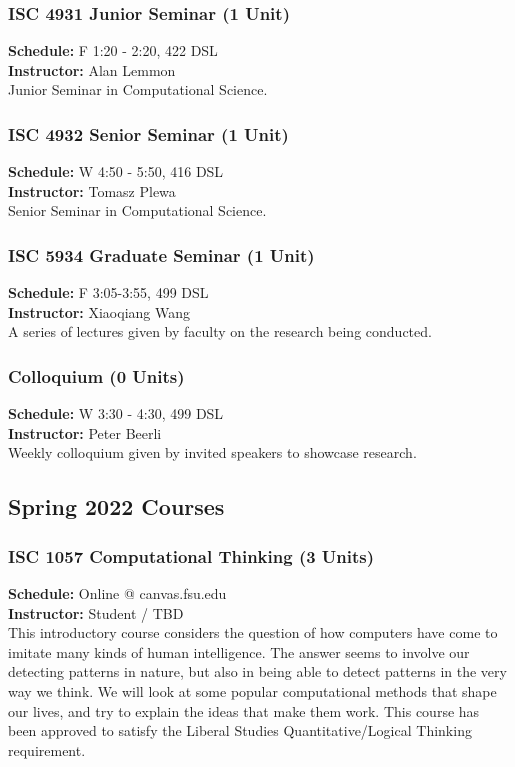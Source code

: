 \documentclass[12pt,a4paper]{article}
\begin{document}
\subsubsection*{ISC 4931 Junior Seminar (1 Unit)}
\textbf{Schedule:} F 1:20 - 2:20, 422 DSL \\
\textbf{Instructor:} Alan Lemmon \\
Junior Seminar in Computational Science.

\subsubsection*{ISC 4932 Senior Seminar (1 Unit)}
\textbf{Schedule:} W 4:50 - 5:50, 416 DSL \\
\textbf{Instructor:} Tomasz Plewa \\
Senior Seminar in Computational Science.

\subsubsection*{ISC 5934 Graduate Seminar (1 Unit)}
\textbf{Schedule:} F 3:05-3:55, 499 DSL \\
\textbf{Instructor:} Xiaoqiang Wang \\
A series of lectures given by faculty on the research being conducted.

\subsubsection*{Colloquium (0 Units)}
\textbf{Schedule:} W 3:30 - 4:30, 499 DSL \\
\textbf{Instructor:} Peter Beerli \\
Weekly colloquium given by invited speakers to showcase research.
\newpage

\subsection{Spring 2022 Courses}
\subsubsection*{ISC 1057 Computational Thinking (3 Units)}
\textbf{Schedule:} Online @ canvas.fsu.edu \\
\textbf{Instructor:} Student / TBD \\
This introductory course considers the question of how computers have come to imitate many kinds of human intelligence. The answer seems to involve our detecting patterns in nature, but also in being able to detect patterns in the very way we think. We will look at some popular computational methods that shape our lives, and try to explain the ideas that make them work. This course has been approved to satisfy the Liberal Studies Quantitative/Logical Thinking requirement.
\end{document}
